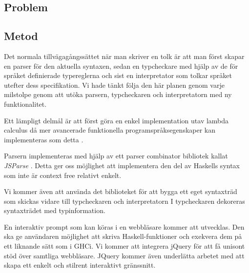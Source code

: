 \subsection{Problem} 

\subsection{Metod}
Det normala tillvägagångssättet när man skriver en tolk är att man först
skapar en parser för den aktuella syntaxen, sedan en typcheckare med 
hjälp av de för språket definierade typereglerna och sist en interpretator
som tolkar språket utefter dess specifikation. Vi hade tänkt följa den här planen genom varje milstolpe genom att utöka parsern, typcheckaren och interpretatorn med ny funktionalitet.

Ett lämpligt delmål är att först göra en enkel implementation utav lambda calculus då mer avancerade funktionella programspråksegenskaper kan implementeras som detta \citep{jones87}.

 Parsern implementeras med hjälp av ett parser combinator bibliotek kallat \emph{JSParse} \citep{jsparse}. Detta ger oss möjlighet att implementera den del av Haskells syntax som inte är context free relativt enkelt.

Vi kommer även att använda det biblioteket för att bygga ett eget syntaxträd som skickas vidare till typcheckaren och interpretatorn I typcheckaren dekoreras syntaxträdet med typinformation.


En interaktiv prompt som kan köras i en webbläsare kommer att utvecklas. Den ska ge användaren möjlighet att skriva Haskell-funktioner och exekvera dem på ett liknande sätt som i GHCi. 
Vi kommer att integrera jQuery \citep{jquery} för att få unisont stöd över samtliga webbläsare. JQuery kommer även underlätta arbetet med att skapa ett enkelt och stilrent interaktivt gränssnitt.

